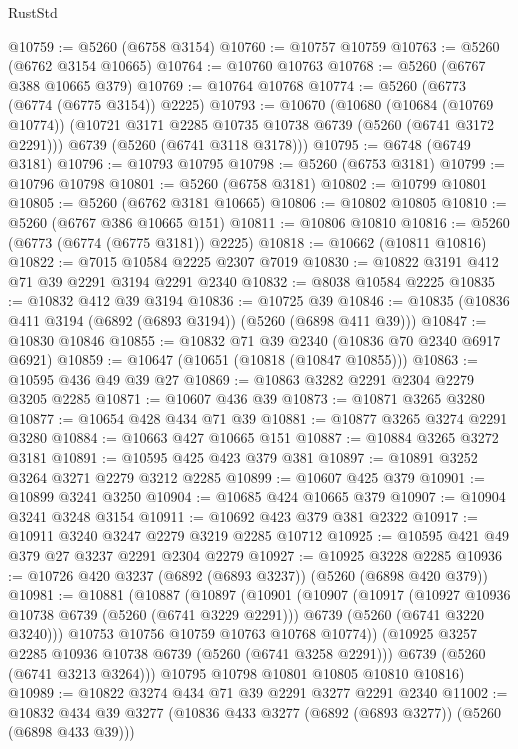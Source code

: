 \begin{lexlean}{RustStd}
\begin{coremodule}
@10759 := @5260 (@6758 @3154)
@10760 := @10757 @10759
@10763 := @5260 (@6762 @3154 @10665)
@10764 := @10760 @10763
@10768 := @5260 (@6767 @388 @10665 @379)
@10769 := @10764 @10768
@10774 := @5260 (@6773 (@6774 (@6775 @3154)) @2225)
@10793 := @10670
    (@10680
      (@10684 (@10769 @10774))
      (@10721 @3171 @2285 @10735 @10738 @6739 (@5260 (@6741 @3172 @2291)))
      @6739
      (@5260 (@6741 @3118 @3178)))
@10795 := @6748 (@6749 @3181)
@10796 := @10793 @10795
@10798 := @5260 (@6753 @3181)
@10799 := @10796 @10798
@10801 := @5260 (@6758 @3181)
@10802 := @10799 @10801
@10805 := @5260 (@6762 @3181 @10665)
@10806 := @10802 @10805
@10810 := @5260 (@6767 @386 @10665 @151)
@10811 := @10806 @10810
@10816 := @5260 (@6773 (@6774 (@6775 @3181)) @2225)
@10818 := @10662 (@10811 @10816)
@10822 := @7015 @10584 @2225 @2307 @7019
@10830 := @10822 @3191 @412 @71 @39 @2291 @3194 @2291 @2340
@10832 := @8038 @10584 @2225
@10835 := @10832 @412 @39 @3194
@10836 := @10725 @39
@10846 := @10835 (@10836 @411 @3194 (@6892 (@6893 @3194)) (@5260 (@6898 @411 @39)))
@10847 := @10830 @10846
@10855 := @10832 @71 @39 @2340 (@10836 @70 @2340 @6917 @6921)
@10859 := @10647 (@10651 (@10818 (@10847 @10855)))
@10863 := @10595 @436 @49 @39 @27
@10869 := @10863 @3282 @2291 @2304 @2279 @3205 @2285
@10871 := @10607 @436 @39
@10873 := @10871 @3265 @3280
@10877 := @10654 @428 @434 @71 @39
@10881 := @10877 @3265 @3274 @2291 @3280
@10884 := @10663 @427 @10665 @151
@10887 := @10884 @3265 @3272 @3181
@10891 := @10595 @425 @423 @379 @381
@10897 := @10891 @3252 @3264 @3271 @2279 @3212 @2285
@10899 := @10607 @425 @379
@10901 := @10899 @3241 @3250
@10904 := @10685 @424 @10665 @379
@10907 := @10904 @3241 @3248 @3154
@10911 := @10692 @423 @379 @381 @2322
@10917 := @10911 @3240 @3247 @2279 @3219 @2285 @10712
@10925 := @10595 @421 @49 @379 @27 @3237 @2291 @2304 @2279
@10927 := @10925 @3228 @2285
@10936 := @10726 @420 @3237 (@6892 (@6893 @3237)) (@5260 (@6898 @420 @379))
@10981 := @10881
    (@10887
      (@10897
        (@10901
          (@10907
            (@10917
              (@10927 @10936 @10738 @6739 (@5260 (@6741 @3229 @2291)))
              @6739
              (@5260 (@6741 @3220 @3240)))
            @10753
            @10756
            @10759
            @10763
            @10768
            @10774))
        (@10925 @3257 @2285 @10936 @10738 @6739 (@5260 (@6741 @3258 @2291)))
        @6739
        (@5260 (@6741 @3213 @3264)))
      @10795
      @10798
      @10801
      @10805
      @10810
      @10816)
@10989 := @10822 @3274 @434 @71 @39 @2291 @3277 @2291 @2340
@11002 := @10832 @434 @39 @3277 (@10836 @433 @3277 (@6892 (@6893 @3277)) (@5260 (@6898 @433 @39)))

\end{coremodule}
\end{lexlean}
